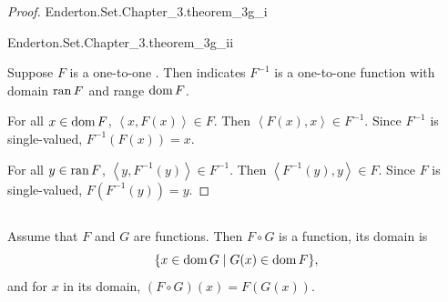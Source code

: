 \documentclass{report}
\begin{document}
\begin{proof}

  \statementpadding

    {Enderton.Set.Chapter\_3.theorem\_3g\_i}

    {Enderton.Set.Chapter\_3.theorem\_3g\_ii}

  Suppose $F$ is a one-to-one .
  Then  indicates $F^{-1}$ is a one-to-one function with
    domain $\mathop{\text{ran}}{F}$ and range $\mathop{\text{dom}}{F}$.

  For all $x \in \mathop{\text{dom}}{F}$, $\left< x, F(x) \right> \in F$.
  Then $\left< F(x), x \right> \in F^{-1}$.
  Since $F^{-1}$ is single-valued, $F^{-1}(F(x)) = x$.

  For all $y \in \mathop{\text{ran}}{F}$, $\left< y, F^{-1}(y) \right> \in F^{-1}$.
  Then $\left< F^{-1}(y), y \right> \in F$.
  Since $F$ is single-valued, $F(F^{-1}(y)) = y$.

\end{proof}

\subsection{}%
\label{sub:theorem-3h}

\begin{theorem}[3H]

  Assume that $F$ and $G$ are functions.
  Then $F \circ G$ is a function, its domain is
    \begin{equation}
      \label{sub:theorem-3h-eq1}
      \{x \in \mathop{\text{dom}}{G} \mid G(x) \in \mathop{\text{dom}}{F}\},
    \end{equation}
    and for $x$ in its domain, $(F \circ G)(x) = F(G(x))$.

\end{theorem}
\end{document}
